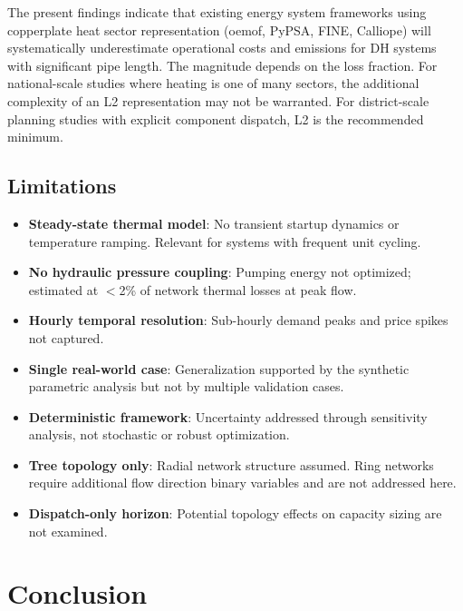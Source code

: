 \documentclass[review,3p]{elsarticle}
\begin{document}
The present findings indicate that existing energy system frameworks
using copperplate heat sector representation (oemof, PyPSA, FINE,
Calliope) will systematically underestimate operational costs and
emissions for DH systems with significant pipe length. The magnitude
depends on the loss fraction. For national-scale studies where heating
is one of many sectors, the additional complexity of an L2 representation
may not be warranted. For district-scale planning studies with explicit
component dispatch, L2 is the recommended minimum.

\subsection{Limitations}
\label{sec:discussion_limitations}

\begin{itemize}
    \item \textbf{Steady-state thermal model}: No transient startup
    dynamics or temperature ramping. Relevant for systems with frequent
    unit cycling.
    \item \textbf{No hydraulic pressure coupling}: Pumping energy not
    optimized; estimated at $<$2\% of network thermal losses at peak flow.
    \item \textbf{Hourly temporal resolution}: Sub-hourly demand peaks
    and price spikes not captured.
    \item \textbf{Single real-world case}: Generalization supported by
    the synthetic parametric analysis but not by multiple validation cases.
    \item \textbf{Deterministic framework}: Uncertainty addressed through
    sensitivity analysis, not stochastic or robust optimization.
    \item \textbf{Tree topology only}: Radial network structure assumed.
    Ring networks require additional flow direction binary variables and
    are not addressed here.
    \item \textbf{Dispatch-only horizon}: Potential topology effects on
    capacity sizing are not examined.
\end{itemize}

\section{Conclusion}
\label{sec:conclusion}
\end{document}
